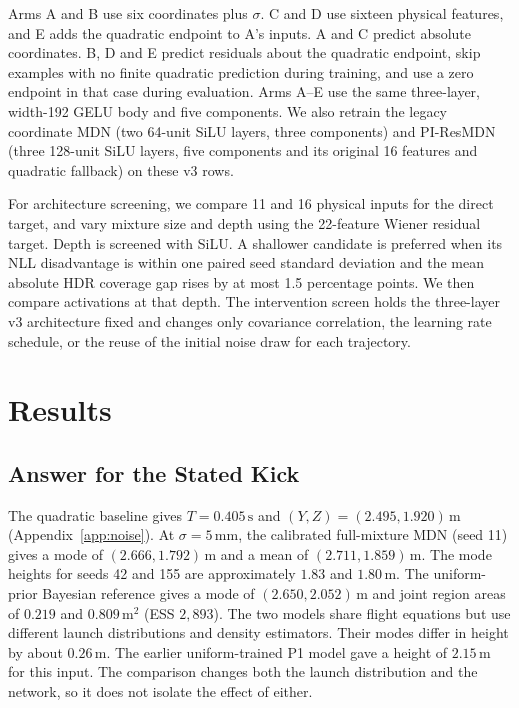 \documentclass[11pt,a4paper]{article}
\begin{document}
Arms A and B use six coordinates plus $\sigma$. C and D use sixteen physical features, and E adds the quadratic endpoint to A's inputs. A and C predict absolute coordinates. B, D and E predict residuals about the quadratic endpoint, skip examples with no finite quadratic prediction during training, and use a zero endpoint in that case during evaluation. Arms A--E use the same three-layer, width-192 GELU body and five components. We also retrain the legacy coordinate MDN (two 64-unit SiLU layers, three components) and PI-ResMDN (three 128-unit SiLU layers, five components and its original 16 features and quadratic fallback) on these v3 rows.

For architecture screening, we compare 11 and 16 physical inputs for the direct target, and vary mixture size and depth using the 22-feature Wiener residual target. Depth is screened with SiLU. A shallower candidate is preferred when its NLL disadvantage is within one paired seed standard deviation and the mean absolute HDR coverage gap rises by at most 1.5 percentage points. We then compare activations at that depth. The intervention screen holds the three-layer v3 architecture fixed and changes only covariance correlation, the learning rate schedule, or the reuse of the initial noise draw for each trajectory.

\section{Results}

\subsection{Answer for the Stated Kick}
\label{sec:case}

The quadratic baseline gives $T=0.405\,\mathrm{s}$ and $(Y,Z)=(2.495,1.920)\,\mathrm{m}$ (Appendix~\ref{app:noise}). At $\sigma=5\,\mathrm{mm}$, the calibrated full-mixture MDN (seed 11) gives a mode of $(2.666,1.792)\,\mathrm{m}$ and a mean of $(2.711,1.859)\,\mathrm{m}$. The mode heights for seeds 42 and 155 are approximately $1.83$ and $1.80\,\mathrm{m}$. The uniform-prior Bayesian reference gives a mode of $(2.650,2.052)\,\mathrm{m}$ and joint region areas of $0.219$ and $0.809\,\mathrm{m^2}$ (ESS $2{,}893$). The two models share flight equations but use different launch distributions and density estimators. Their modes differ in height by about $0.26\,\mathrm{m}$. The earlier uniform-trained P1 model gave a height of $2.15\,\mathrm{m}$ for this input. The comparison changes both the launch distribution and the network, so it does not isolate the effect of either.
\end{document}
